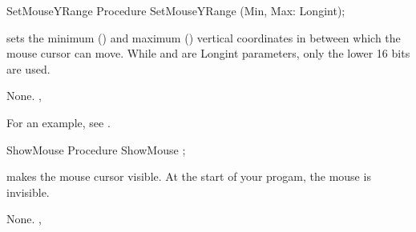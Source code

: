 \html{}
\begin{procedure}{SetMouseYRange}
\Declaration
Procedure SetMouseYRange (Min, Max: Longint);

\Description

sets the minimum () and maximum () vertical coordinates in between which the
mouse cursor can move.
While  and  are Longint parameters, only the lower 16 bits 
are used.

\Errors
None.
\SeeAlso
{}, 
\end{procedure}
For an example, see .
\begin{procedure}{ShowMouse}
\Declaration
Procedure ShowMouse ;

\Description

 makes the mouse cursor visible.
At the start of your progam, the mouse is invisible.

\Errors
None.
\SeeAlso
{},
\end{procedure}
\html{}

